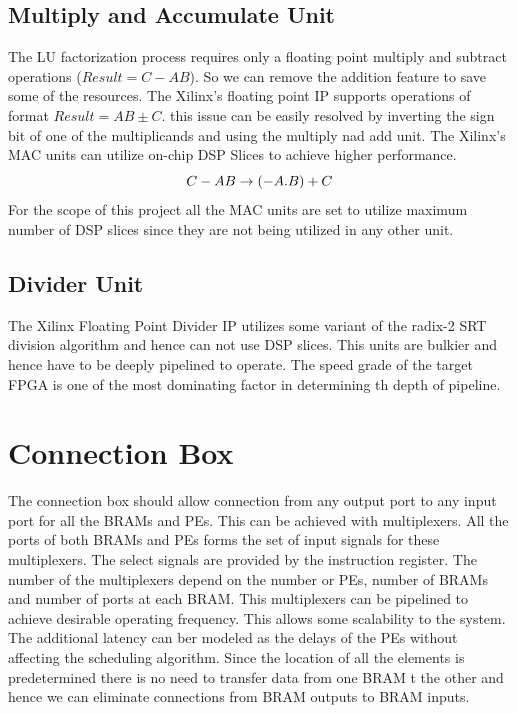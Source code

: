 \subsection{Multiply and Accumulate Unit}
The LU factorization process requires only a floating point multiply and subtract operations 
($Result = C - AB$). So we can remove the addition feature to save some of the resources.
The Xilinx's floating point IP supports operations of format $Result = AB \pm C $. this issue can
be easily resolved by inverting the sign bit of one of the multiplicands and using the multiply nad
add unit. The Xilinx's MAC units can utilize on-chip DSP Slices to achieve higher performance. 
\begin{equation*}
    \centering
    C - AB \rightarrow (-A.B) + C
\end{equation*}
For the scope of this project all the MAC units are set to utilize maximum number of DSP slices
since they are not being utilized in any other unit.

\pagebreak
\subsection{Divider Unit}
The Xilinx Floating Point Divider IP utilizes some variant of the radix-2 SRT division
algorithm and hence can not use DSP slices. This units are bulkier and hence have to be deeply
pipelined to operate. The speed grade of the target FPGA is one of the most dominating
factor in determining th depth of pipeline.

\section{Connection Box}
The connection box should allow connection from any output port to any input 
port for all the BRAMs and PEs. This can be achieved with multiplexers. All
the ports of both BRAMs and PEs forms the set of input signals for these multiplexers.
The select signals are provided by the instruction register. The number of 
the multiplexers depend on the number or PEs, number of BRAMs and number of ports at 
each BRAM. This multiplexers can be pipelined to achieve desirable operating frequency.
This allows some scalability to the system. The additional latency can ber modeled 
as the delays of the PEs without affecting the scheduling algorithm. Since the 
location of all the elements is predetermined there is no need to transfer data from one 
BRAM t the other and hence we can eliminate connections from BRAM outputs to BRAM inputs.
